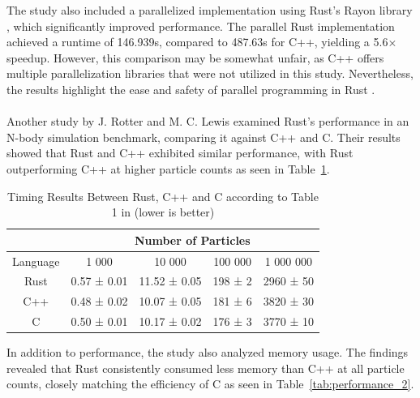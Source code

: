 The study also included a parallelized implementation using Rust’s Rayon library \cite[]{RayonrsRayon2025}, which significantly improved performance. The parallel Rust implementation achieved a runtime of 146.939s, compared to 487.63s for C++, yielding a 5.6× speedup. However, this comparison may be somewhat unfair, as C++ offers multiple parallelization libraries that were not utilized in this study. Nevertheless, the results highlight the ease and safety of parallel programming in Rust \cite{veytsmanRewriteItRust2024}.

\paragraph{}

Another study by J. Rotter and M. C. Lewis \cite[]{rotterNBodyPerformanceKDTree2022} examined Rust’s performance in an N-body simulation benchmark, comparing it against C++ and C. Their results showed that Rust and C++ exhibited similar performance, with Rust outperforming C++ at higher particle counts as seen in Table~\ref{tab:performance_1}.

\begin{table}[H]
    \centering
    \begin{tabular}{|c|c|c|c|c|}
        \hline
        & \multicolumn{4}{c|}{Number of Particles} \\  
        \hline
        Language & 1 000 & 10 000 & 100 000 & 1 000 000 \\
        \hline
        Rust & 0.57 ± 0.01 & 11.52 ± 0.05 & 198 ± 2 & 2960 ± 50 \\
        C++ & 0.48 ± 0.02 & 10.07 ± 0.05 & 181 ± 6 & 3820 ± 30 \\
        C & 0.50 ± 0.01 & 10.17 ± 0.02 & 176 ± 3 & 3770 ± 10 \\
        \hline
    \end{tabular}
    \caption{Timing Results Between Rust, C++ and C according to Table 1 in \cite[]{rotterNBodyPerformanceKDTree2022} (lower is better)}
    \label{tab:performance_1}
\end{table}

In addition to performance, the study also analyzed memory usage. The findings revealed that Rust consistently consumed less memory than C++ at all particle counts, closely matching the efficiency of C as seen in Table~\ref{tab:performance_2}.

